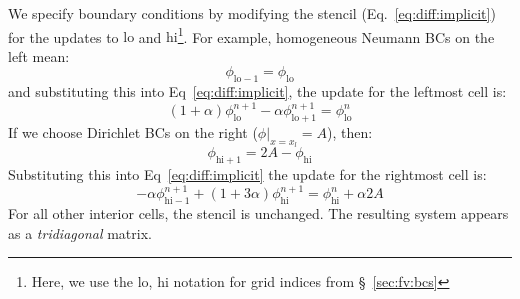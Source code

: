 We specify boundary conditions by modifying the stencil
(Eq.~\ref{eq:diff:implicit}) for the updates to $\mathrm{lo}$ and
$\mathrm{hi}$\footnote{Here, we use the $\mathrm{lo}$, $\mathrm{hi}$
  notation for grid indices from \S~\ref{sec:fv:bcs}}.  For example, homogeneous
Neumann BCs on the left mean:
\begin{equation}
\phi_\mathrm{lo-1} = \phi_\mathrm{lo}
\end{equation}
and substituting this into Eq~\ref{eq:diff:implicit}, the update for the leftmost cell is:
\begin{equation}
 (1 + \alpha) \phi_\mathrm{lo}^{n+1} -\alpha \phi_\mathrm{lo+1}^{n+1}  = 
  \phi_\mathrm{lo}^n
\end{equation}
If we choose Dirichlet BCs on the right ($\phi |_{x=x_l} = A$), then:
\begin{equation}
\phi_\mathrm{hi+1} = 2 A - \phi_\mathrm{hi}
\end{equation}
Substituting this into Eq~\ref{eq:diff:implicit} the update for the rightmost cell is:
\begin{equation}
- \alpha \phi_\mathrm{hi-1}^{n+1} + (1 + 3\alpha) \phi_\mathrm{hi}^{n+1}  =
  \phi_\mathrm{hi}^n + \alpha 2 A
\end{equation}
For all other interior cells, the stencil is unchanged.  The resulting
system appears as a {\em tridiagonal} matrix.
